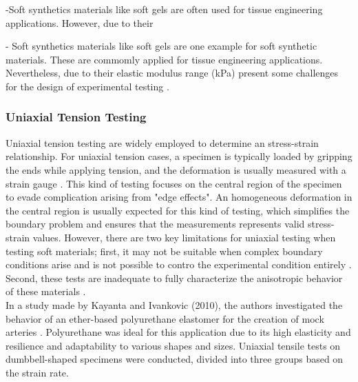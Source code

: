 -Soft synthetics materials like soft gels are often used for tissue engineering applications.
However, due to their 

- Soft synthetics materials like soft gels are one example for soft synthetic materials. These
are commomly applied for tissue engineering applications. Nevertheless, due to their elastic 
modulus range (kPa) present some challenges for the design of experimental testing \cite{Liu2009}.

\subsubsection*{Uniaxial Tension Testing}

Uniaxial tension testing are widely employed to determine an stress-strain relationship.
For uniaxial tension cases, a specimen is typically loaded by gripping the ends while applying 
tension, and the deformation is usually measured with a strain gauge \cite{Bergström2015}.
This kind of testing focuses on the central region of the specimen to evade complication arising from 
"edge effects". An homogeneous deformation in the central region is usually expected for this kind of testing, 
which simplifies the boundary problem and ensures that the measurements represents valid stress-strain values.
However, there are two key limitations for uniaxial testing when testing soft materials; first, 
it may not be suitable when complex boundary conditions arise and is not possible to contro the 
experimental condition entirely \cite{Seshaiyer2003}. Second, these tests are inadequate to 
fully characterize the anisotropic behavior of these materials \cite{Cox2006}.\\

In a study made by Kayanta and Ivankovic (2010), the authors investigated the behavior of an ether-based polyurethane 
elastomer for the creation of mock arteries \cite{Kanyanta2010}. Polyurethane was ideal for this application due to 
its high elasticity and resilience and adaptability to various shapes and sizes. Uniaxial tensile tests on 
dumbbell-shaped specimens were conducted, divided into three groups based on the strain rate.

